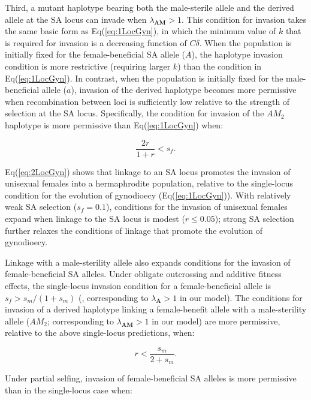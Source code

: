 \documentclass{article}
\begin{document}
Third, a mutant haplotype bearing both the male-sterile allele and the derived allele at the SA locus can invade when $\lambda_{\mathbf{AM}} > 1$. This condition for invasion takes the same basic form as Eq(\ref{eq:1LocGyn}), in which the minimum value of $k$ that is required for invasion is a decreasing function of $C \delta$. When the population is initially fixed for the female-beneficial SA allele ($A$), the haplotype invasion condition is more restrictive (requiring larger $k$) than the condition in Eq(\ref{eq:1LocGyn}). In contrast, when the population is initially fixed for the male-beneficial allele ($a$), invasion of the derived haplotype becomes more permissive when recombination between loci is sufficiently low relative to the strength of selection at the SA locus. Specifically, the condition for invasion of the $AM_2$ haplotype is more permissive than Eq(\ref{eq:1LocGyn}) when: 

\begin{equation}\label{eq:2LocGyn}
	\frac{2 r}{1 + r} < s_f.
\end{equation}

\noindent Eq(\ref{eq:2LocGyn}) shows that linkage to an SA locus promotes the invasion of unisexual females into a hermaphrodite population, relative to the single-locus condition for the evolution of gynodioecy (Eq(\ref{eq:1LocGyn})). With relatively weak SA selection ($s_f = 0.1$), conditions for the invasion of unisexual females expand when linkage to the SA locus is modest ($r \leq 0.05$); strong SA selection further relaxes the conditions of linkage that promote the evolution of gynodioecy. 

Linkage with a male-sterility allele also expands conditions for the invasion of female-beneficial SA alleles. Under obligate outcrossing and additive fitness effects, the single-locus invasion condition for a female-beneficial allele is $s_f > s_m / (1+s_m)$ (\citealt{Kidwell1977}, corresponding to $\lambda_{\mathbf{A}} > 1$ in our model). The conditions for invasion of a derived haplotype linking a female-benefit allele with a male-sterility allele ($AM_2$; corresponding to $\lambda_{\mathbf{AM}} > 1$ in our model) are more permissive, relative to the above single-locus predictions, when:

\begin{equation}\label{eq:2LocGynSA}
	r < \frac{s_m}{2 + s_m}.
\end{equation}

\noindent Under partial selfing, invasion of female-beneficial SA alleles is more permissive than in the single-locus case when:
\end{document}

